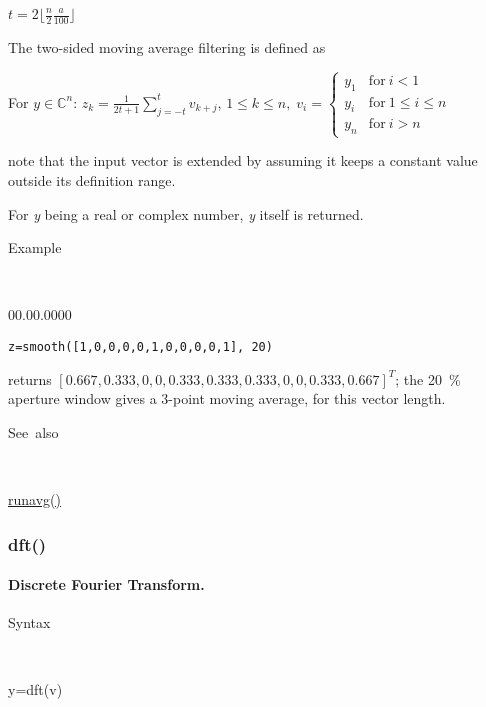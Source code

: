 \medskip{}
$t=$${\displaystyle 2 \lfloor \frac{n}{2} \frac{a}{100} \rfloor }$
\medskip{}

The two-sided moving average filtering is defined as

\medskip{}
For $y\in$$\mathbb{C}^{n}$: $z_{k}=$${\displaystyle \frac{1}{2t+1} \sum\limits _{j=-t}^{t}v_{k+j}}$,\;
$1\leq k\leq n,\; v_{i}=\left\{ \begin{array}{ll}
y_{1} & \mathrm{for}\: i < 1\\
y_{i} & \mathrm{for}\: 1 \leq i \leq n\\
y_{n} & \mathrm{for}\: i > n\end{array}\right.$
\medskip{}

note that the input vector is extended by assuming it keeps a constant value outside its definition range.

For \textit{y} being a real or complex number, \textit{y} itself is returned.

\medskip{}\medskip{}

\begin{description}
\item [Example]~
\end{description}
\begin{lyxlist}{00.00.0000}
\item [\texttt{z=smooth([1,0,0,0,0,1,0,0,0,0,1], 20)}]
\end{lyxlist}
returns $\left[0.667,0.333,0,0,0.333,0.333,0.333,0,0,0.333,0.667\right]^T$; the 20~\% aperture window gives a 3-point moving average, for this vector length.
\begin{description}
\item [See~also]~
\end{description}
\textcolor{blue}{\hyperlink{runavg}{runavg()}}


\newpage
{}


\subsubsection*{\hypertarget{dft}{}{\Large dft()}}


\paragraph{\label{par:Discrete-Fourier-Transform}Discrete Fourier Transform.}

\begin{description}
\item [Syntax]~
\end{description}
y=dft(v)

